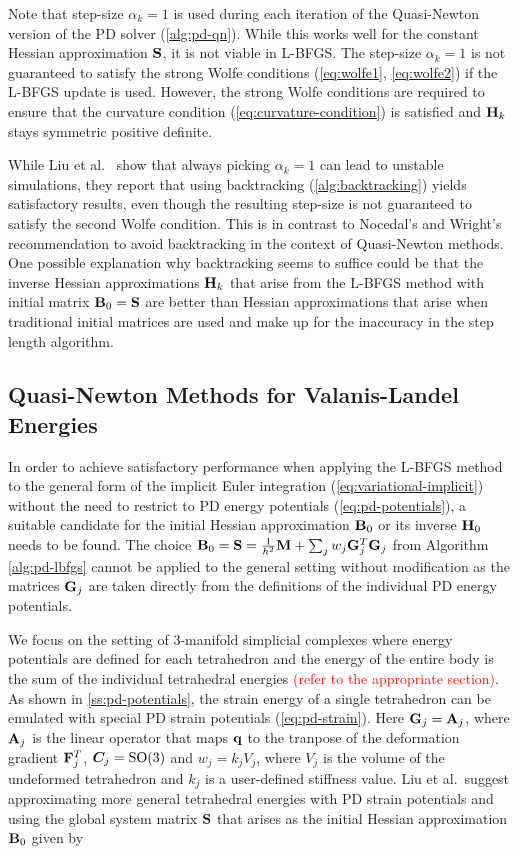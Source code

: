 Note that step-size $\alpha_k = 1$ is 
used during each iteration of the Quasi-Newton version of the PD solver (\cref{alg:pd-qn}).
While this works well for the constant Hessian approximation $\mathbf{S}$, it is not viable in L-BFGS. The step-size $\alpha_k = 1$
is not guaranteed to satisfy the strong Wolfe conditions (\cref{eq:wolfe1}, \cref{eq:wolfe2}) if the L-BFGS update is used. However,
the strong Wolfe conditions are required to ensure that the curvature condition (\cref{eq:curvature-condition}) is satisfied 
and $\mathbf{H}_k$ stays symmetric positive definite. 

While Liu et al.\ \cite{liu2017} show that always picking $\alpha_k = 1$ can lead to
unstable simulations, they report that using backtracking (\cref{alg:backtracking}) yields satisfactory results, even though 
the resulting step-size is not guaranteed to satisfy the second Wolfe condition. This is in contrast to Nocedal's and Wright's
recommendation \cite{nocedal2006} to avoid backtracking in the context of  Quasi-Newton methods. One possible explanation why 
backtracking seems to suffice could be that the inverse 
Hessian approximations $\mathbf{H}_k$ that arise from the L-BFGS method with initial matrix $\mathbf{B}_0 = \mathbf{S}$ are better than
Hessian approximations that arise when traditional initial matrices are used and make up for the inaccuracy in the step length
algorithm.

\subsection{Quasi-Newton Methods for Valanis-Landel Energies}\label{ss:qn-valanis-landel}
In order to achieve satisfactory performance when applying the L-BFGS method to the general form of the implicit Euler integration 
(\cref{eq:variational-implicit}) without the need to restrict to PD energy potentials (\cref{eq:pd-potentials}), a suitable
candidate for the initial Hessian approximation $\mathbf{B}_0$ or its inverse $\mathbf{H}_0$ needs to be found. The choice $\mathbf{B}_0 = 
\mathbf{S} = \frac{1}{h^2}\mathbf{M} + \sum_j w_j \mathbf{G}_j^T \mathbf{G}_j$ from Algorithm \ref{alg:pd-lbfgs} cannot be applied to the general setting 
without modification as the matrices $\mathbf{G}_j$ are taken directly from the definitions of the individual PD energy potentials.

We focus on the setting of 3-manifold simplicial complexes where energy potentials are defined for each tetrahedron and the
energy of the entire body is the sum of the individual tetrahedral energies \textcolor{red}{(refer to the appropriate section)}.
As shown in \cref{ss:pd-potentials}, the strain energy of a single tetrahedron can be emulated with special PD strain 
potentials (\cref{eq:pd-strain}). Here $\mathbf{G}_j = \mathbf{A}_j$, where $\mathbf{A}_j$ is the linear operator that maps $\mathbf{q}$ 
to the tranpose of the deformation gradient $\mathbf{F}^T_j$, $\bm{C}_j = \text{SO}(3)$ and $w_j = k_jV_j$, where $V_j$ is the
volume of the undeformed tetrahedron and $k_j$ is a user-defined stiffness value. 
Liu et al.\ suggest approximating more general tetrahedral energies with PD strain potentials and using the global system
matrix $\mathbf{S}$ that arises as the initial Hessian approximation $\mathbf{B}_0$ given by

